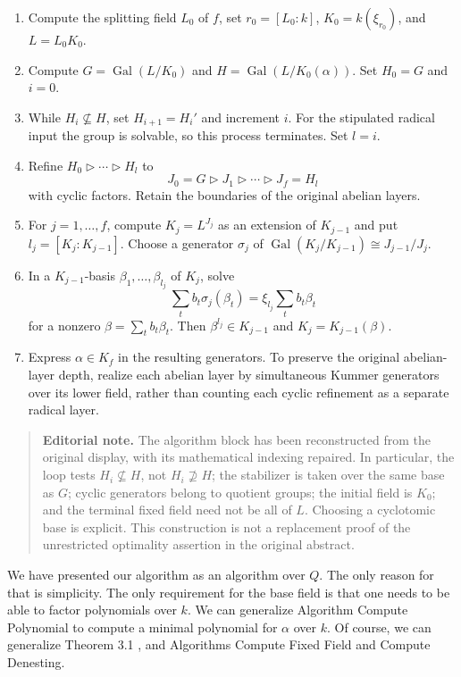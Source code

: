 \documentclass[11pt,letterpaper]{article}
\newcommand{\editorialnote}[1]{\begin{quote}\small\noindent
  \textbf{Editorial note.} #1\end{quote}}
\DeclareMathOperator{\Gal}{Gal}
\begin{document}
\begin{enumerate}[label=\arabic*.,leftmargin=*]
\item Compute the splitting field $L_0$ of $f$, set $r_0=[L_0:k]$, $K_0=k(\xi_{r_0})$, and $L=L_0K_0$.
\item Compute $G=\Gal(L/K_0)$ and $H=\Gal(L/K_0(\alpha))$. Set $H_0=G$ and $i=0$.
\item While $H_i\not\subseteq H$, set $H_{i+1}=H_i'$ and increment $i$. For the stipulated radical input the group is solvable, so this process terminates. Set $l=i$.
\item Refine $H_0\triangleright\cdots\triangleright H_l$ to
\[
 J_0=G\triangleright J_1\triangleright\cdots\triangleright J_f=H_l
\]
with cyclic factors. Retain the boundaries of the original abelian layers.
\item For $j=1,\ldots,f$, compute $K_j=L^{J_j}$ as an extension of $K_{j-1}$ and put $l_j=[K_j:K_{j-1}]$. Choose a generator $\sigma_j$ of
$\Gal(K_j/K_{j-1})\cong J_{j-1}/J_j$.
\item In a $K_{j-1}$-basis $\beta_1,\ldots,\beta_{l_j}$ of $K_j$, solve
\[
 \sum_t b_t\sigma_j(\beta_t)=\xi_{l_j}\sum_t b_t\beta_t
\]
for a nonzero $\beta=\sum_t b_t\beta_t$. Then $\beta^{l_j}\in K_{j-1}$ and $K_j=K_{j-1}(\beta)$.
\item Express $\alpha\in K_f$ in the resulting generators. To preserve the original abelian-layer depth, realize each abelian layer by simultaneous Kummer generators over its lower field, rather than counting each cyclic refinement as a separate radical layer.
\end{enumerate}

\editorialnote{The algorithm block has been reconstructed from the original display, with its mathematical indexing repaired. In particular, the loop tests $H_i\not\subseteq H$, not $H_i\not\supseteq H$; the stabilizer is taken over the same base as $G$; cyclic generators belong to quotient groups; the initial field is $K_0$; and the terminal fixed field need not be all of $L$. Choosing a cyclotomic base is explicit. This construction is not a replacement proof of the unrestricted optimality assertion in the original abstract.}

We have presented our algorithm as an algorithm over $Q$. The only reason for that is simplicity. The only requirement for the base field is that one needs to be able to factor polynomials over $k$. We can generalize Algorithm Compute Polynomial to compute a minimal polynomial for $\alpha$ over $k$. Of course, we can generalize Theorem 3.1 , and Algorithms Compute Fixed Field and Compute Denesting.
\end{document}
